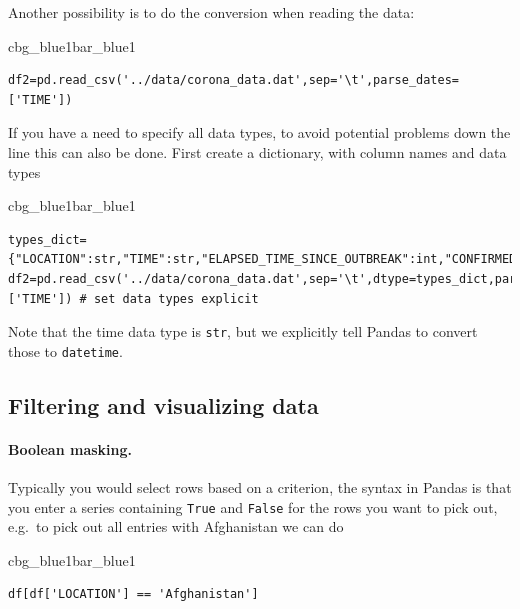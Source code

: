 \documentclass[%
oneside,                 %
final,                   %
10pt]{article}
\newenvironment{_pro_tight}[2]{
   \def\FrameCommand{\color{#2}\vrule width 1mm\normalcolor\colorbox{#1}}
   \FrameRule0.6pt\MakeFramed {\advance\hsize-2mm\FrameRestore}\vskip3mm}
   {\vskip0mm\endMakeFramed}
\newenvironment{pro}[2]{
\bgroup\rmfamily
\fboxsep=0mm\relax
\begin{_pro_tight}{#1}{#2}
\list{}{\parsep=-2mm\parskip=0mm\topsep=0pt\leftmargin=2mm
\rightmargin=2\leftmargin\leftmargin=4pt\relax}
\item\relax}
{\endlist\end{_pro_tight}\egroup}
\begin{document}
Another possibility is to do the conversion when reading the data:


\begin{pro}{cbg_blue1}{bar_blue1}\begin{Verbatim}[numbers=none,fontsize=\fontsize{9pt}{9pt},baselinestretch=0.95,xleftmargin=2mm]
df2=pd.read_csv('../data/corona_data.dat',sep='\t',parse_dates=['TIME']) 

\end{Verbatim}
\end{pro}
\noindent

If you have a need to specify all data types, to avoid potential problems down the line this can also be done. First create a dictionary, with column names and data types



\begin{pro}{cbg_blue1}{bar_blue1}\begin{Verbatim}[numbers=none,fontsize=\fontsize{9pt}{9pt},baselinestretch=0.95,xleftmargin=2mm]
types_dict={"LOCATION":str,"TIME":str,"ELAPSED_TIME_SINCE_OUTBREAK":int,"CONFIRMED":int,"DEATHS":int,"RECOVERED":int}
df2=pd.read_csv('../data/corona_data.dat',sep='\t',dtype=types_dict,parse_dates=['TIME']) # set data types explicit

\end{Verbatim}
\end{pro}
\noindent

Note that the time data type is \texttt{str}, but we explicitly tell Pandas to convert those to \texttt{datetime}.

\subsection{Filtering and visualizing data}
\paragraph{Boolean masking.}
Typically you would select rows based on a criterion, the syntax in Pandas is that you enter a series containing \texttt{True} and \texttt{False} for the rows you want to pick out, e.g.~to pick out all entries with Afghanistan we can do


\begin{pro}{cbg_blue1}{bar_blue1}\begin{Verbatim}[numbers=none,fontsize=\fontsize{9pt}{9pt},baselinestretch=0.95,xleftmargin=2mm]
df[df['LOCATION'] == 'Afghanistan']

\end{Verbatim}
\end{pro}
\noindent
\end{document}
